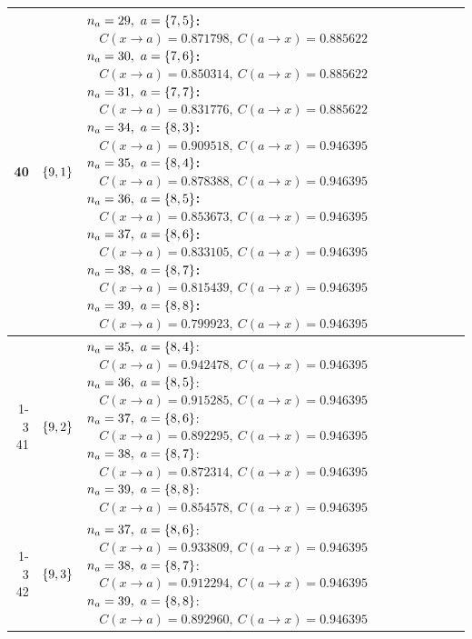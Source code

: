 \begin{longtable}{@{}r l >{\raggedright\arraybackslash}p{}@{}}
  40 & \(\left\{9,1\right\}\) & \(n_a=29,\ a=\sig{7,5}\):\newline \(\quad C(x\!\to\!a)=0.871798,\ C(a\!\to\!x)=0.885622\)\newline \(n_a=30,\ a=\sig{7,6}\):\newline \(\quad C(x\!\to\!a)=0.850314,\ C(a\!\to\!x)=0.885622\)\newline \(n_a=31,\ a=\sig{7,7}\):\newline \(\quad C(x\!\to\!a)=0.831776,\ C(a\!\to\!x)=0.885622\)\newline \(n_a=34,\ a=\sig{8,3}\):\newline \(\quad C(x\!\to\!a)=0.909518,\ C(a\!\to\!x)=0.946395\)\newline \(n_a=35,\ a=\sig{8,4}\):\newline \(\quad C(x\!\to\!a)=0.878388,\ C(a\!\to\!x)=0.946395\)\newline \(n_a=36,\ a=\sig{8,5}\):\newline \(\quad C(x\!\to\!a)=0.853673,\ C(a\!\to\!x)=0.946395\)\newline \(n_a=37,\ a=\sig{8,6}\):\newline \(\quad C(x\!\to\!a)=0.833105,\ C(a\!\to\!x)=0.946395\)\newline \(n_a=38,\ a=\sig{8,7}\):\newline \(\quad C(x\!\to\!a)=0.815439,\ C(a\!\to\!x)=0.946395\)\newline \(n_a=39,\ a=\sig{8,8}\):\newline \(\quad C(x\!\to\!a)=0.799923,\ C(a\!\to\!x)=0.946395\) \\
  \cmidrule(lr){1-3}
  41 & \(\left\{9,2\right\}\) & \(n_a=35,\ a=\sig{8,4}\):\newline \(\quad C(x\!\to\!a)=0.942478,\ C(a\!\to\!x)=0.946395\)\newline \(n_a=36,\ a=\sig{8,5}\):\newline \(\quad C(x\!\to\!a)=0.915285,\ C(a\!\to\!x)=0.946395\)\newline \(n_a=37,\ a=\sig{8,6}\):\newline \(\quad C(x\!\to\!a)=0.892295,\ C(a\!\to\!x)=0.946395\)\newline \(n_a=38,\ a=\sig{8,7}\):\newline \(\quad C(x\!\to\!a)=0.872314,\ C(a\!\to\!x)=0.946395\)\newline \(n_a=39,\ a=\sig{8,8}\):\newline \(\quad C(x\!\to\!a)=0.854578,\ C(a\!\to\!x)=0.946395\) \\
  \cmidrule(lr){1-3}
  42 & \(\left\{9,3\right\}\) & \(n_a=37,\ a=\sig{8,6}\):\newline \(\quad C(x\!\to\!a)=0.933809,\ C(a\!\to\!x)=0.946395\)\newline \(n_a=38,\ a=\sig{8,7}\):\newline \(\quad C(x\!\to\!a)=0.912294,\ C(a\!\to\!x)=0.946395\)\newline \(n_a=39,\ a=\sig{8,8}\):\newline \(\quad C(x\!\to\!a)=0.892960,\ C(a\!\to\!x)=0.946395\) \\

\end{longtable}
